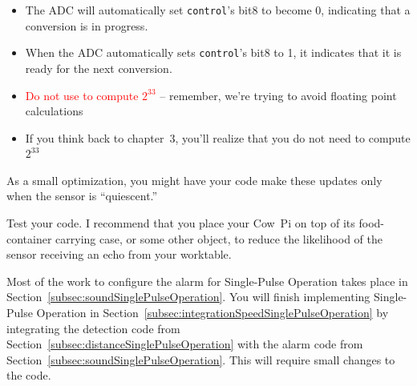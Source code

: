 \begin{description}
\begin{description}
\begin{description}
\begin{itemize}
                            \item The ADC will automatically set \lstinline{control}'s bit8 to become 0, indicating that a conversion is in progress.
                        \end{itemize}
                    \begin{itemize}
                        \item When the ADC automatically sets \lstinline{control}'s bit8 to 1, it indicates that it is ready for the next conversion.
                    \end{itemize}
                \end{description}
            \begin{itemize}
                \item \textcolor{red}{Do not use  to compute $2^{33}$} -- remember, we're trying to avoid floating point calculations
                \item If you think back to chapter~3, you'll realize that you do not need to compute $2^{33}$
            \end{itemize}
        \end{description}
\end{description}
As a small optimization, you might have your code make these updates only when the sensor is ``quiescent.''

\vspace{0.5cm}

Test your code.
I recommend that you place your Cow~Pi on top of its food-container carrying case, or some other object, to reduce the likelihood of the sensor receiving an echo from your worktable.

\vspace{0.5cm}

Most of the work to configure the alarm for Single-Pulse Operation takes place in Section~\ref{subsec:soundSinglePulseOperation}.
You will finish implementing Single-Pulse Operation in Section~\ref{subsec:integrationSpeedSinglePulseOperation} by integrating the detection code from Section~\ref{subsec:distanceSinglePulseOperation} with the alarm code from Section~\ref{subsec:soundSinglePulseOperation}.
This will require small changes to the code.
